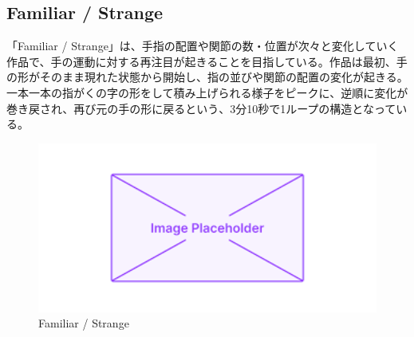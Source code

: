 \subsection*{Familiar / Strange}
「Familiar / Strange」は、手指の配置や関節の数・位置が次々と変化していく作品で、手の運動に対する再注目が起きることを目指している。作品は最初、手の形がそのまま現れた状態から開始し、指の並びや関節の配置の変化が起きる。一本一本の指がくの字の形をして積み上げられる様子をピークに、逆順に変化が巻き戻され、再び元の手の形に戻るという、3分10秒で1ループの構造となっている。
\begin{figure}[H]
  \centering
  \includegraphics[width=15cm]{img/placeholder.png}
  \caption{Familiar / Strange}
  \label{fig:familiar_strange}
\end{figure}

